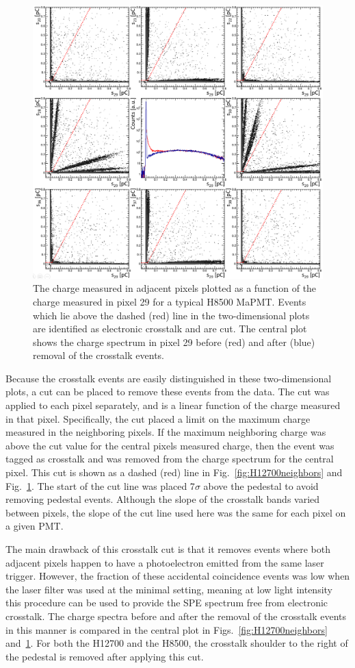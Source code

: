 \begin{figure}[h!bt]
    \centering
	\includegraphics[width=0.9\linewidth]{figures/H8500_ct_v2.png}
	\caption{The charge measured in adjacent pixels plotted as a function of the charge measured in pixel 29 for a typical H8500 MaPMT. Events which lie above the dashed (red) line in the two-dimensional plots are identified as electronic crosstalk and are cut. The central plot shows the charge spectrum in pixel 29 before (red) and after (blue) removal of the crosstalk events.}
	\label{fig:H8500neighbors}
\end{figure}

Because the crosstalk events are easily distinguished in these two-dimensional plots, a cut can be placed to remove these events from the data. The cut was applied to each pixel separately, and is a linear function of the charge measured in that pixel. Specifically, the cut placed a limit on the maximum charge measured in the neighboring pixels. If the maximum neighboring charge was above the cut value for the central pixel\textquotesingle s measured charge, then the event was tagged as crosstalk and was removed from the charge spectrum for the central pixel. This cut is shown as a dashed (red) line in Fig.~\ref{fig:H12700neighbors} and Fig.~\ref{fig:H8500neighbors}. The start of the cut line was placed 7$\sigma$ above the pedestal to avoid removing pedestal events. Although the slope of the crosstalk bands varied between pixels, the slope of the cut line used here was the same for each pixel on a given PMT. 

The main drawback of this crosstalk cut is that it removes events where both adjacent pixels  happen to have a photoelectron emitted from the same laser trigger. However, the fraction of these accidental coincidence events was low when the laser filter was used at the minimal setting, meaning at low light intensity this procedure can be used to provide the SPE spectrum free from electronic crosstalk. The charge spectra before and after the removal of the crosstalk events in this manner is compared in the central plot in Figs.~\ref{fig:H12700neighbors} and~\ref{fig:H8500neighbors}. For both the H12700 and the H8500, the crosstalk shoulder to the right of the pedestal is removed after applying this cut. 
